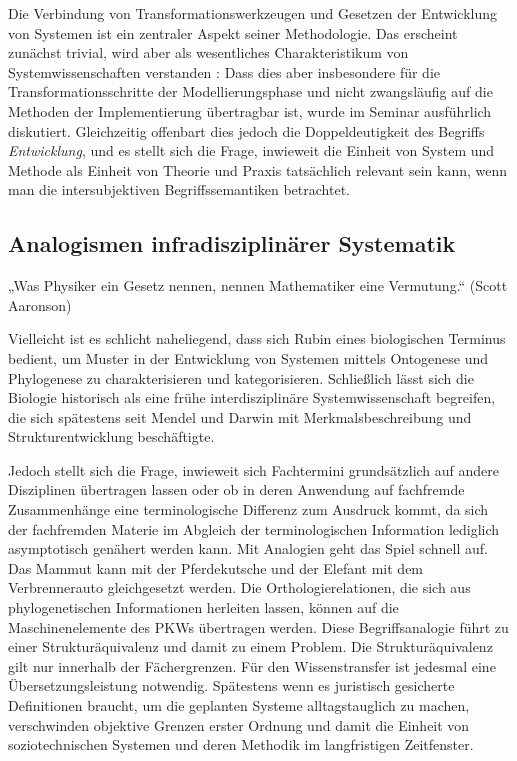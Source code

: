 \documentclass[a4paper,11pt]{article}
\begin{document}
Die Verbindung von Transformationswerkzeugen und Gesetzen der Entwicklung von
Systemen ist ein zentraler Aspekt seiner Methodologie. Das erscheint zunächst
trivial, wird aber als wesentliches Charakteristikum von Systemwissenschaften
verstanden \cite{Kleemann2020}: Dass dies aber insbesondere für die
Transformationsschritte der Modellierungsphase und nicht zwangsläufig auf die
Methoden der Implementierung übertragbar ist, wurde im Seminar ausführlich
diskutiert. Gleichzeitig offenbart dies jedoch die Doppeldeutigkeit des
Begriffs \emph{Entwicklung}, und es stellt sich die Frage, inwieweit die
Einheit von System und Methode als Einheit von Theorie und Praxis tatsächlich
relevant sein kann, wenn man die intersubjektiven Begriffssemantiken
betrachtet.

\subsection{Analogismen infradisziplinärer Systematik}
„Was Physiker ein Gesetz nennen, nennen Mathematiker eine Vermutung.“ (Scott
Aaronson)

Vielleicht ist es schlicht naheliegend, dass sich Rubin eines biologischen
Terminus bedient, um Muster in der Entwicklung von Systemen mittels Ontogenese
und Phylogenese zu charakterisieren und kategorisieren. Schließlich lässt sich
die Biologie historisch als eine frühe interdisziplinäre Systemwissenschaft
begreifen, die sich spätestens seit Mendel und Darwin mit Merkmalsbeschreibung
und Strukturentwicklung beschäftigte.

Jedoch stellt sich die Frage, inwieweit sich Fachtermini grundsätzlich auf
andere Disziplinen übertragen lassen oder ob in deren Anwendung auf fachfremde
Zusammenhänge eine terminologische Differenz zum Ausdruck kommt, da sich der
fachfremden Materie im Abgleich der terminologischen Information lediglich
asymptotisch genähert werden kann. Mit Analogien geht das Spiel schnell
auf. Das Mammut kann mit der Pferdekutsche und der Elefant mit dem
Verbrennerauto gleichgesetzt werden. Die Orthologierelationen, die sich aus
phylogenetischen Informationen herleiten lassen, können auf die
Maschinenelemente des PKWs übertragen werden. Diese Begriffsanalogie führt zu
einer Strukturäquivalenz und damit zu einem Problem. Die Strukturäquivalenz
gilt nur innerhalb der Fächergrenzen. Für den Wissenstransfer ist jedesmal
eine Übersetzungsleistung notwendig. Spätestens wenn es juristisch gesicherte
Definitionen braucht, um die geplanten Systeme alltagstauglich zu machen,
verschwinden objektive Grenzen erster Ordnung und damit die Einheit von
soziotechnischen Systemen und deren Methodik im langfristigen Zeitfenster.
\end{document}
